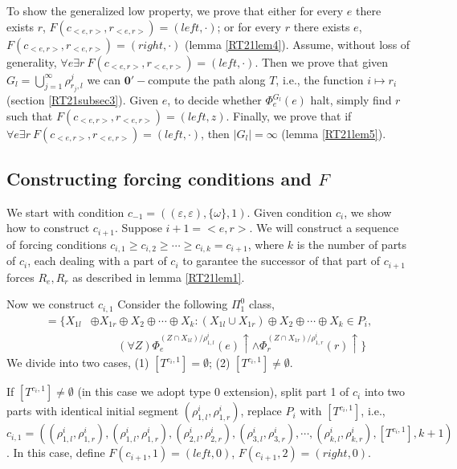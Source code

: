 \documentclass[options]{amsart}
\theoremstyle{definition}
\theoremstyle{remark}
\newtheorem{Ramsey's theorem}[theorem]{Ramsey's theorem}
\begin{document}
To show the generalized low property,
we prove that either for every
$e$ there exists $r$,
$F(c_{<e,r>},r_{<e,r>}) = (left,\cdot)$;
or for every $r$ there exists $e$,
$F(c_{<e,r>},r_{<e,r>}) = (right,\cdot)$
(lemma \ref{RT21lem4}).
Assume, without loss of generality,
$\forall e\exists r\
F(c_{<e,r>},r_{<e,r>}) = (left,\cdot)$.
Then we prove that given $G_l=\bigcup\limits_{j=1}^\infty
\rho^j_{r_j,l}$ we can $\mathbf{0}'-$compute the
path along $T$, i.e., the function
$i\mapsto r_i$ (section \ref{RT21subsec3}).
Given $e$, to decide
whether $\Phi_e^{G_l}(e)$ halt,
simply find $r$ such that
$F(c_{<e,r>},r_{<e,r>}) = (left,z)$.
Finally, we prove that if
$\forall e\exists r\
F(c_{<e,r>},r_{<e,r>}) = (left,\cdot)$,
then $|G_l|=\infty$ (lemma \ref{RT21lem5}).

\subsection{Constructing
forcing conditions and $F$}\label{RT21subsec1}
We start with condition
$c_{-1}=( (\varepsilon,\varepsilon), \{\omega\},1)$.
Given condition $c_i$, we show how to construct
$c_{i+1}$. Suppose $i+1 = <e,r>$.
We will construct a sequence of forcing conditions
$c_{i,1}\geq c_{i,2}\geq\cdots\geq c_{i,k}=
c_{i+1}$, where $k$ is the number of parts
of $c_i$, each dealing
with a part of $c_i$ to garantee the
successor of that part of $c_{i+1}$ forces
$R_e, R_r$ as described in lemma \ref{RT21lem1}.

Now we construct $c_{i,1}$
Consider the following
$\Pi_1^0$ class,
\begin{align}
[T^{c_i,1}]
=\{X_{1l}&\oplus X_{1r}\oplus X_2\oplus\cdots\oplus
X_k:
(X_{1l}\cup X_{1r})
\oplus X_2\oplus \cdots \oplus X_k\in
P_i, \\ \nonumber
&\hspace{1cm}(\forall Z)
\Phi_e^{(Z\cap X_{1l})/\rho^i_{1,l}}(e)
\uparrow\wedge
\Phi_r^{(Z\cap X_{1r})/\rho^i_{1,r}}(r)
\uparrow
\}
\end{align}
We divide into two cases,
(1) $[T^{c_i,1}]=\emptyset$;
(2) $[T^{c_i,1}]\ne\emptyset$.

If $[T^{c_i,1}]\ne \emptyset$
(in this case we adopt type 0 extension),
split
part 1 of
$c_i$ into two parts with identical
initial segment $(\rho^i_{1,l},\rho^i_{1,r})$,
replace $P_i$ with $[T^{c_i,1}]$,
i.e.,
$$c_{i,1} =
((\rho^i_{1,l},\rho^i_{1,r}),
(\rho^i_{1,l},\rho^i_{1,r}),
(\rho^i_{2,l},\rho^i_{2,r}),
(\rho^i_{3,l},\rho^i_{3,r}),\cdots,
(\rho^i_{k,l},\rho^i_{k,r}),
[T^{c_{i},1}], k+1)$$.
In this case, define
$F(c_{i+1}, 1) =
(left, 0)$,
$F(c_{i+1}, 2) =
(right, 0)$.
\end{document}
